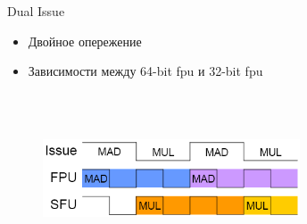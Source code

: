 \begin{frame}{Dual Issue\cite{web:rwgpu}}
\begin{itemize}
  \item Двойное опережение
  \item Зависимости между 64-bit fpu и 32-bit fpu
\end{itemize}



\begin{figure}
\centering
\includegraphics[height=2in, width=3in]{artwork/images/dual_issue}
\label{fig:dual_issue}
\end{figure}

\end{frame}

